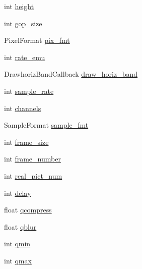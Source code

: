 \begin{DoxyCompactItemize}
\item 
int \hyperlink{struct_tao_1_1_f_fmpeg_1_1_f_fmpeg_1_1_a_v_codec_context_a597410af2a22385c0390e46a85b0a9b4}{height}
\item 
int \hyperlink{struct_tao_1_1_f_fmpeg_1_1_f_fmpeg_1_1_a_v_codec_context_a8763961562428a870c1c8d8ad4111777}{gop\_\-size}
\item 
PixelFormat \hyperlink{struct_tao_1_1_f_fmpeg_1_1_f_fmpeg_1_1_a_v_codec_context_a7927d1fe4aef73b7925665a8626abd4c}{pix\_\-fmt}
\item 
int \hyperlink{struct_tao_1_1_f_fmpeg_1_1_f_fmpeg_1_1_a_v_codec_context_a4f888f5d7ac714a2df74ca234f2085bc}{rate\_\-emu}
\item 
DrawhorizBandCallback \hyperlink{struct_tao_1_1_f_fmpeg_1_1_f_fmpeg_1_1_a_v_codec_context_a70d93baee76e9e991d9700d10a1d9172}{draw\_\-horiz\_\-band}
\item 
int \hyperlink{struct_tao_1_1_f_fmpeg_1_1_f_fmpeg_1_1_a_v_codec_context_af87b640341719b6a8ad693a314d00e51}{sample\_\-rate}
\item 
int \hyperlink{struct_tao_1_1_f_fmpeg_1_1_f_fmpeg_1_1_a_v_codec_context_aaa6de950ebe89fe0b464b0f0def51900}{channels}
\item 
SampleFormat \hyperlink{struct_tao_1_1_f_fmpeg_1_1_f_fmpeg_1_1_a_v_codec_context_a8fded1c6367f7ded8bf54d2f9e923489}{sample\_\-fmt}
\item 
int \hyperlink{struct_tao_1_1_f_fmpeg_1_1_f_fmpeg_1_1_a_v_codec_context_af3893a4c2663a5a1ff6a4a59a5335312}{frame\_\-size}
\item 
int \hyperlink{struct_tao_1_1_f_fmpeg_1_1_f_fmpeg_1_1_a_v_codec_context_a6a8545eb60bdc6417a0419c87f1dffe7}{frame\_\-number}
\item 
int \hyperlink{struct_tao_1_1_f_fmpeg_1_1_f_fmpeg_1_1_a_v_codec_context_ae3097a5e183a3ae80b2406f537c85802}{real\_\-pict\_\-num}
\item 
int \hyperlink{struct_tao_1_1_f_fmpeg_1_1_f_fmpeg_1_1_a_v_codec_context_a0c477477858ef49485a27194f18c14d8}{delay}
\item 
float \hyperlink{struct_tao_1_1_f_fmpeg_1_1_f_fmpeg_1_1_a_v_codec_context_a920ddaa1bcf9914451d377dacf22c04b}{qcompress}
\item 
float \hyperlink{struct_tao_1_1_f_fmpeg_1_1_f_fmpeg_1_1_a_v_codec_context_a719cc58978dc1aaa2e9790ca7b32af77}{qblur}
\item 
int \hyperlink{struct_tao_1_1_f_fmpeg_1_1_f_fmpeg_1_1_a_v_codec_context_a184f337bac7a5434eb61f681ed680885}{qmin}
\item 
int \hyperlink{struct_tao_1_1_f_fmpeg_1_1_f_fmpeg_1_1_a_v_codec_context_a6bcfa22032b804e464da90582c67d702}{qmax}

\end{DoxyCompactItemize}
